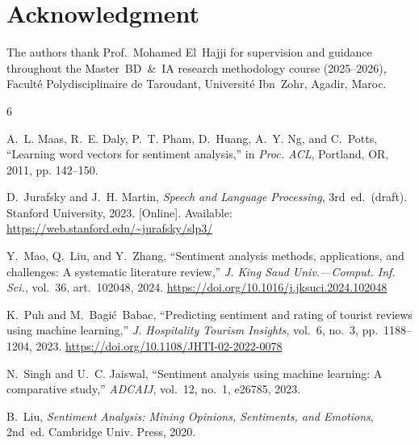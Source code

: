 \documentclass[conference]{IEEEtran}
\begin{document}
\section*{Acknowledgment}

The authors thank Prof.\ Mohamed El~Hajji for supervision and
guidance throughout the Master~BD~\&~IA research methodology
course (2025--2026), Facult\'e Polydisciplinaire de Taroudant,
Universit\'e Ibn~Zohr, Agadir, Maroc.

\balance

\begin{thebibliography}{6}

A.~L. Maas, R.~E. Daly, P.~T. Pham, D.~Huang, A.~Y. Ng, and C.~Potts,
``Learning word vectors for sentiment analysis,''
in \textit{Proc. ACL}, Portland, OR, 2011, pp. 142--150.

D.~Jurafsky and J.~H. Martin,
\textit{Speech and Language Processing}, 3rd~ed.\ (draft).
Stanford University, 2023.
[Online]. Available: \url{https://web.stanford.edu/~jurafsky/slp3/}

Y.~Mao, Q.~Liu, and Y.~Zhang,
``Sentiment analysis methods, applications, and challenges:
  A systematic literature review,''
\textit{J. King Saud Univ.---Comput. Inf. Sci.},
vol.~36, art.~102048, 2024.
\url{https://doi.org/10.1016/j.jksuci.2024.102048}

K.~Puh and M.~Bagi\'c~Babac,
``Predicting sentiment and rating of tourist reviews
  using machine learning,''
\textit{J. Hospitality Tourism Insights},
vol.~6, no.~3, pp.~1188--1204, 2023.
\url{https://doi.org/10.1108/JHTI-02-2022-0078}

N.~Singh and U.~C. Jaiswal,
``Sentiment analysis using machine learning:
  A comparative study,''
\textit{ADCAIJ}, vol.~12, no.~1, e26785, 2023.

B.~Liu,
\textit{Sentiment Analysis: Mining Opinions, Sentiments, and Emotions},
2nd~ed. Cambridge Univ. Press, 2020.

\end{thebibliography}
\end{document}
